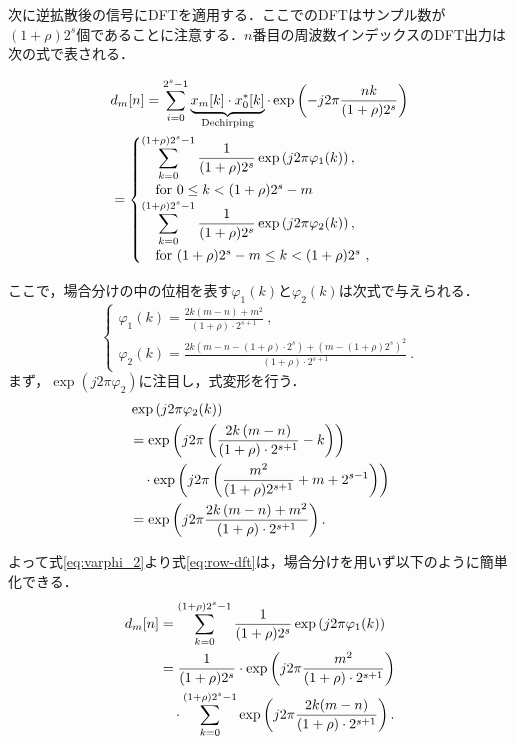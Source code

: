\documentclass[technicalreport]{ieicej}
\begin{document}
次に逆拡散後の信号にDFTを適用する．ここでのDFTはサンプル数が$(1+\rho)2^s$個であることに注意する．$n$番目の周波数インデックスのDFT出力は次の式で表される．

\begin{align}
&d_m[n]=\sum_{i=0}^{{2^{s}-1}}\underbrace{x_m[k]\cdot x_0^*[k]}_{\mathrm{Dechirping}}\cdot \exp\left(-j2\pi\frac{nk}{(1+\rho)2^s}\right) \notag\\
&=
\begin{cases}
\displaystyle \sum_{k=0}^{(1+\rho)2^s-1}\frac{1}{{(1+\rho)2^s}}\exp\left(j2\pi \varphi_1 (k)\right),\ \\\quad\mathrm{for}\  0\le k < (1+\rho)2^s-m\\
\displaystyle \sum_{k=0}^{(1+\rho)2^s-1}\frac{1}{{(1+\rho)2^s}}\exp\left(j2\pi \varphi_2 (k)\right),\\\quad\mathrm{for}\   (1+\rho)2^s-m\le k <(1+\rho)2^s\ ,
\end{cases} \label{eq:row-dft}
\end{align}

ここで，場合分けの中の位相を表す$\varphi_1 (k)$と$\varphi_2 (k)$は次式で与えられる．
\begin{equation}
    \begin{cases}
    \displaystyle \varphi_1 (k)=\frac{2k(m-n)+m^2}{(1+\rho)  \cdot 2^{s+1}}\ ,\\
    \displaystyle \varphi_2 (k)=\frac{2k\left(m-n-(1+\rho)\cdot 2^s\right)+(m-(1+\rho)2^s)^2}{(1+\rho)  \cdot 2^{s+1}}\ .
    \end{cases}
\end{equation}
まず，$\exp(j2\pi\varphi_2)$に注目し，式変形を行う．
\begin{align}
&\exp\left(j2\pi \varphi_2 (k)\right)\notag\\
&=\exp\left(j2\pi \left(\frac{2k\left(m-n\right)}{(1+\rho)  \cdot 2^{s+1}}-k\right)\right)\notag\\
&\quad \cdot\exp\left(j2\pi \left(\frac{m^2}{(1+\rho)2^{s+1}}+m+2^{s-1}\right)\right)\notag\\
&=\exp\left(j2\pi \frac{2k\left(m-n\right)+m^2}{(1+\rho)  \cdot 2^{s+1}}\right).\label{eq:varphi_2}
\end{align}

よって式\eqref{eq:varphi_2}より式\eqref{eq:row-dft}は，場合分けを用いず以下のように簡単化できる．
\begin{align}
d_m[n]&=\sum_{k=0}^{(1+\rho)2^s-1}
\frac{1}{{(1+\rho)2^s}}\exp\left(j2\pi \varphi_1 (k)\right) \notag\\
&=\frac{1}{{(1+\rho)2^s}}\cdot\exp\left(j2\pi\frac{m^2}{(1+\rho)  \cdot 2^{s+1}}\right)\notag\\
&\quad \cdot\sum_{k=0}^{(1+\rho)2^s-1}\exp\left(j2\pi \frac{2k(m-n)}{(1+\rho)  \cdot 2^{s+1}}\right).
\end{align}
\end{document}
